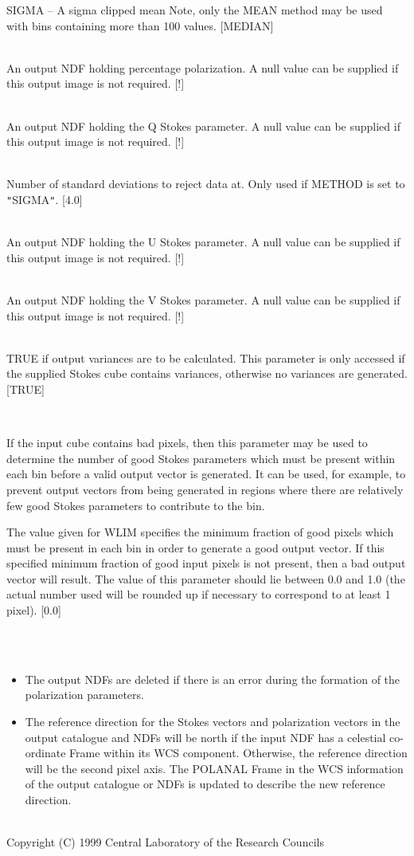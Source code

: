 \documentclass[twoside,11pt]{article}
\renewcommand{\_}{\texttt{\symbol{95}}}
\newcommand{\sstsubsection}[1]{ \item[{#1}] \mbox{} \\}
\newcommand{\sstnotes}[1]{\item[Notes:] \mbox{} \\[1.3ex] #1}
\newcommand{\sstdiytopic}[2]{\item[{\hspace{-0.35em}#1\hspace{-0.35em}:}]
\mbox{} \\[1.3ex] #2}
\newcommand{\sstitemlist}[1]{
  \mbox{} \\
  \vspace{-3.5ex}
  \begin{itemize}
     #1
  \end{itemize}
}
\newcommand{\sstitem}{\item}
\newcommand{\sstsubsection}[1]{\item[{#1}]}
\newcommand{\sstnotes}[1]{\item[Notes:] #1 }
\newcommand{\sstdiytopic}[2]{\item[{#1}] #2 }
\newcommand{\sstitemlist}[1]{
      \begin{itemize}
         #1
      \end{itemize}
      \\
   }
\newcommand{\sstitem}{\item}
\begin{document}
{{{{            \sstitem
               SIGMA     -- A sigma clipped mean
            Note, only the MEAN method may be used with bins containing more
            than 100 values. [MEDIAN]
         }
      }
      \sstsubsection{
         P = NDF (Write)
      }{
         An output NDF holding percentage polarization. A null value can be
         supplied if this output image is not required. [!]
      }
      \sstsubsection{
         Q = NDF (Write)
      }{
         An output NDF holding the Q Stokes parameter. A null value can be
         supplied if this output image is not required. [!]
      }
      \sstsubsection{
         SIGMAS = \_REAL (Read)
      }{
         Number of standard deviations to reject data at. Only used if
         METHOD is set to {\tt "}SIGMA{\tt "}. [4.0]
      }
      \sstsubsection{
         U = NDF (Write)
      }{
         An output NDF holding the U Stokes parameter. A null value can be
         supplied if this output image is not required. [!]
      }
      \sstsubsection{
         V = NDF (Write)
      }{
         An output NDF holding the V Stokes parameter. A null value can be
         supplied if this output image is not required. [!]
      }
      \sstsubsection{
         VARIANCE = \_LOGICAL (Read)
      }{
         TRUE if output variances are to be calculated.  This parameter
         is only accessed if the supplied Stokes cube contains variances,
         otherwise no variances are generated.  [TRUE]
      }
      \sstsubsection{
         WLIM = \_REAL (Read)
      }{
         If the input cube contains bad pixels, then this parameter
         may be used to determine the number of good Stokes parameters
         which must be present within each bin before a valid output vector
         is generated.  It can be used, for example, to prevent output
         vectors from being generated in regions where there are relatively
         few good Stokes parameters to contribute to the bin.

         The value given for WLIM specifies the minimum fraction of
         good pixels which must be present in each bin in order to
         generate a good output vector. If this specified minimum fraction
         of good input pixels is not present, then a bad output vector
         will result. The value of this parameter should lie between 0.0
         and 1.0 (the actual number used will be rounded up if necessary
         to correspond to at least 1 pixel). [0.0]
      }
   }
   \sstnotes{
      \sstitemlist{

         \sstitem
         The output NDFs are deleted if there is an error during the
         formation of the polarization parameters.

         \sstitem
         The reference direction for the Stokes vectors and polarization
         vectors in the output catalogue and NDFs will be north if the input NDF
         has a celestial co-ordinate Frame within its WCS component. Otherwise,
         the reference direction will be the second pixel axis. The POLANAL
         Frame in the WCS information of the output catalogue or NDFs is
         updated to describe the new reference direction.
      }
   }
   \sstdiytopic{
      Copyright
   }{
      Copyright (C) 1999 Central Laboratory of the Research Councils
   }
}
\end{document}
